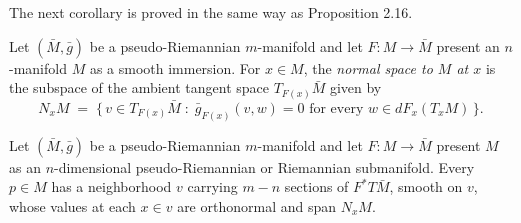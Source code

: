 The next corollary is proved in the same way as Proposition 2.16.

\begin{definition}
\label{def:pseudo-normal-space}
\leanok
{}
Let $(\bar{M},\bar{g})$ be a pseudo-Riemannian $m$-manifold and let $F : M \to \bar{M}$ present an $n$-manifold $M$ as a smooth immersion. For $x \in M$, the \emph{normal space to $M$ at $x$} is the subspace of the ambient tangent space $T_{F(x)}\bar{M}$ given by
\[
  N_x M \;=\; \bigl\{\, v \in T_{F(x)}\bar{M} \;:\; \bar{g}_{F(x)}(v,w) = 0 \text{ for every } w \in dF_x(T_xM) \,\bigr\}.
\]
\end{definition}

\begin{lemma}
\label{lem:pseudo-normal-space-frame}
\leanok
{}
Let $(\bar{M},\bar{g})$ be a pseudo-Riemannian $m$-manifold and let $F : M \to \bar{M}$ present $M$ as an $n$-dimensional pseudo-Riemannian or Riemannian submanifold. Every $p \in M$ has a neighborhood $v$ carrying $m-n$ sections of $F^* T\bar{M}$, smooth on $v$, whose values at each $x \in v$ are orthonormal and span $N_x M$.
\end{lemma}

